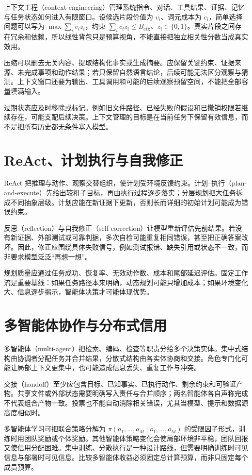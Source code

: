 上下文工程（context engineering）管理系统指令、对话、工具结果、证据、记忆与任务状态如何进入有限窗口。设候选片段价值为 $v_i$、词元成本为 $c_i$，简单选择问题可以写为 $\max\sum_iv_iz_i$，约束 $\sum_ic_iz_i\le B_{\mathrm{ctx}}$、$z_i\in\{0,1\}$。真实片段之间存在冗余和依赖，所以线性背包只是预算视角，不能直接把独立相关性分数当成真实效用。

压缩可以删去无关内容、提取结构化事实或生成摘要。应保留关键约束、证据来源、未完成事项和动作结果；若只保留自然语言结论，后续可能无法区分观察与猜测。上下文窗口还要为输出、工具调用和可能的后续观察预留空间，不能把全部容量填满输入。

过期状态应及时移除或标记。例如旧文件路径、已经失败的假设和已撤销权限若继续存在，可能支配后续决策。上下文管理的目标是在当前任务下保留有效信息，而不是把所有历史都无条件塞入模型。

\section{ReAct、计划执行与自我修正}

ReAct 把推理与动作、观察交替组织，使计划受环境反馈约束\cite{react}。计划--执行（plan-and-execute）先给出较粗子目标，再由执行过程逐步落实；分层规划把大任务拆成不同抽象层级。计划应能在新证据下更新，否则长而详细的初始计划可能成为错误约束。

反思（reflection）与自我修正（self-correction）让模型重新评估先前结果。若没有新证据、外部测试或可靠判据，多次自检可能重复相同错误，甚至把正确答案改坏。因此，修正应围绕具体失败信号，例如测试报错、缺失引用或状态不一致，而非要求模型泛泛“再想一想”。

规划质量应通过任务成功、恢复率、无效动作数、成本和尾部延迟评估。固定工作流是重要基线：如果任务路径本来明确，动态规划可能只增加成本；如果环境变化大、信息逐步揭示，智能体决策才可能体现优势。

\section{多智能体协作与分布式信用}

多智能体（multi-agent）把检索、编码、检查等职责分给多个决策实体。集中式结构由协调者分配任务并合并结果，分散式结构由各实体协商和交接。角色专门化可能让局部上下文更集中，也可能造成信息丢失、重复工作与冲突。

交接（handoff）至少应包含目标、已知事实、已执行动作、剩余约束和可验证产物。共享文件或外部状态需要明确写入责任与合并顺序；两名智能体各自声称完成不代表组合产物一致。投票也不能自动消除相关错误，尤其当模型、提示和数据源高度相似时。

多智能体学习可把联合策略分解为 $\pi(a_1,\ldots,a_M\mid o_1,\ldots,o_M)$ 的受限因子形式，训练时用团队奖励或个体奖励。其他智能体策略变化会使局部环境非平稳，团队回报又使信用分配困难。集中训练、分散执行是一种设计路线，但需要明确训练时可见信息与部署时可见信息。比较多智能体收益必须固定总计算预算，而非只固定每个成员预算。

